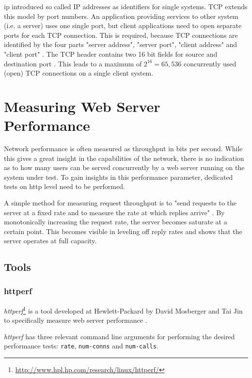 \gls{ip} introduced so called IP addresses as identifiers for single systems. TCP extends this model by port numbers. An application providing services to other system (i.e. a server) uses one single port, but client applications need to open separate ports for each TCP connection. This is required, because TCP connections are identified by the four parts "server address", "server port", "client address" and "client port" \cite{tcp}. The TCP header contains two 16 bit fields for source and destination port \cite{kn1}. This leads to a maximum of $2^{16} = 65,536$ concurrently used (open) TCP connections on a single client system.

\section{Measuring Web Server Performance}

Network performance is often measured as throughput in bits per second. While this gives a great insight in the capabilities of the network, there is no indication as to how many users can be served concurrently by a web server running on the system under test. To gain insights in this performance parameter, dedicated tests on \gls{http} level need to be performed.

A simple method for measuring request throughput is to "send requests to the server at a fixed rate and to measure the rate at which replies arrive" \cite{httperf}. By monotonically increasing the request rate, the server becomes saturate  at a certain point. This becomes visible in leveling off reply rates and shows that the server operates at full capacity. \cite{httperf}

\subsection{Tools}

\subsubsection{httperf}

\textit{httperf}\footnote{\url{http://www.hpl.hp.com/research/linux/httperf/}} is a tool developed at Hewlett-Packard by David Mosberger and Tai Jin to specifically measure web server performance \cite{httperf}.

\textit{httperf} has three relevant command line arguments for performing the desired performance tests: \texttt{rate}, \texttt{num-conns} and \texttt{num-calls}.

